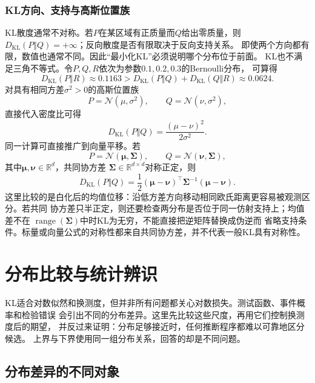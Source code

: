 \subsubsection{KL方向、支持与高斯位置族}
KL散度通常不对称。若\(P\)在某区域有正质量而\(Q\)给出零质量，则
\(D_{\mathrm{KL}}(P\Vert Q)=+\infty\)；反向散度是否有限取决于反向支持关系。
即使两个方向都有限，数值也通常不同。因此“最小化KL”必须说明哪个分布位于前面。
KL也不满足三角不等式。令\(P,Q,R\)依次为参数\(0.1,0.2,0.3\)的Bernoulli分布，
可算得
\[
  D_{\mathrm{KL}}(P\Vert R)\approx0.1163
  >
  D_{\mathrm{KL}}(P\Vert Q)+D_{\mathrm{KL}}(Q\Vert R)
  \approx0.0624.
\]
对具有相同方差\(\sigma^2>0\)的高斯位置族
\[
  P=\mathcal{N}(\mu,\sigma^2),
  \qquad
  Q=\mathcal{N}(\nu,\sigma^2),
\]
直接代入密度比可得
\begin{equation}
  D_{\mathrm{KL}}(P\Vert Q)
  =
  \frac{(\mu-\nu)^2}{2\sigma^2}.
  \label{eq:information-gaussian-location-kl}
\end{equation}
同一计算可直接推广到向量平移。若
\[
  P=\mathcal{N}(\bm{\mu},\bm{\Sigma}),\qquad
  Q=\mathcal{N}(\bm{\nu},\bm{\Sigma}),
\]
其中\(\bm{\mu},\bm{\nu}\in\mathbb{R}^d\)，共同协方差
\(\bm{\Sigma}\in\mathbb{R}^{d\times d}\)对称正定，则
\begin{equation}
  D_{\mathrm{KL}}(P\Vert Q)
  =
  \frac12
  (\bm{\mu}-\bm{\nu})^{\top}
  \bm{\Sigma}^{-1}
  (\bm{\mu}-\bm{\nu}).
  \label{eq:information-vector-gaussian-translation-kl}
\end{equation}
这里比较的是白化后的均值位移：沿低方差方向移动相同欧氏距离更容易被观测区分。若共同
协方差只半正定，则还要检查两分布是否位于同一仿射支持上；均值差不在
\(\operatorname{range}(\bm{\Sigma})\)中时KL为无穷，不能直接把逆矩阵替换成伪逆而
省略支持条件。标量或向量公式的对称性都来自共同协方差，并不代表一般KL具有对称性。
\section{分布比较与统计辨识}
\label{sec:information-comparison-identification}

KL适合对数似然和换测度，但并非所有问题都关心对数损失。测试函数、事件概率和检验错误
会引出不同的分布差异。这里先比较这些尺度，再用它们控制换测度后的期望，
并反过来证明：分布足够接近时，任何推断程序都难以可靠地区分候选。
上界与下界使用同一组分布关系，回答的却是不同问题。

\subsection{分布差异的不同对象}
\label{sec:information-distribution-discrepancies}
